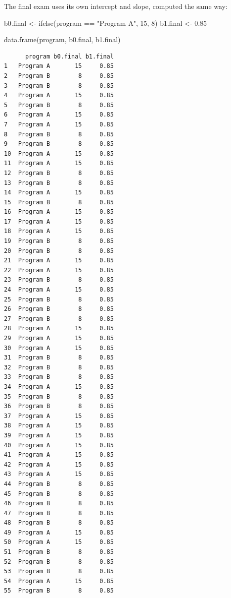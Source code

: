 \documentclass[
  letterpaper,
  DIV=11,
  numbers=noendperiod]{scrreprt}
\newenvironment{Shaded}{\begin{snugshade}}{\end{snugshade}}
\newcommand{\DecValTok}[1]{\textcolor[rgb]{0.68,0.00,0.00}{#1}}
\newcommand{\FloatTok}[1]{\textcolor[rgb]{0.68,0.00,0.00}{#1}}
\newcommand{\FunctionTok}[1]{\textcolor[rgb]{0.28,0.35,0.67}{#1}}
\newcommand{\NormalTok}[1]{\textcolor[rgb]{0.00,0.23,0.31}{#1}}
\newcommand{\OtherTok}[1]{\textcolor[rgb]{0.00,0.23,0.31}{#1}}
\newcommand{\SpecialCharTok}[1]{\textcolor[rgb]{0.37,0.37,0.37}{#1}}
\newcommand{\StringTok}[1]{\textcolor[rgb]{0.13,0.47,0.30}{#1}}
\begin{document}
The final exam uses its own intercept and slope, computed the same way:

\begin{Shaded}
\begin{Highlighting}[]
\NormalTok{b0.final }\OtherTok{\textless{}{-}} \FunctionTok{ifelse}\NormalTok{(program }\SpecialCharTok{==} \StringTok{"Program A"}\NormalTok{, }\DecValTok{15}\NormalTok{, }\DecValTok{8}\NormalTok{)}
\NormalTok{b1.final }\OtherTok{\textless{}{-}} \FloatTok{0.85}

\FunctionTok{data.frame}\NormalTok{(program, b0.final, b1.final)}
\end{Highlighting}
\end{Shaded}

\begin{verbatim}
      program b0.final b1.final
1   Program A       15     0.85
2   Program B        8     0.85
3   Program B        8     0.85
4   Program A       15     0.85
5   Program B        8     0.85
6   Program A       15     0.85
7   Program A       15     0.85
8   Program B        8     0.85
9   Program B        8     0.85
10  Program A       15     0.85
11  Program A       15     0.85
12  Program B        8     0.85
13  Program B        8     0.85
14  Program A       15     0.85
15  Program B        8     0.85
16  Program A       15     0.85
17  Program A       15     0.85
18  Program A       15     0.85
19  Program B        8     0.85
20  Program B        8     0.85
21  Program A       15     0.85
22  Program A       15     0.85
23  Program B        8     0.85
24  Program A       15     0.85
25  Program B        8     0.85
26  Program B        8     0.85
27  Program B        8     0.85
28  Program A       15     0.85
29  Program A       15     0.85
30  Program A       15     0.85
31  Program B        8     0.85
32  Program B        8     0.85
33  Program B        8     0.85
34  Program A       15     0.85
35  Program B        8     0.85
36  Program B        8     0.85
37  Program A       15     0.85
38  Program A       15     0.85
39  Program A       15     0.85
40  Program A       15     0.85
41  Program A       15     0.85
42  Program A       15     0.85
43  Program A       15     0.85
44  Program B        8     0.85
45  Program B        8     0.85
46  Program B        8     0.85
47  Program B        8     0.85
48  Program B        8     0.85
49  Program A       15     0.85
50  Program A       15     0.85
51  Program B        8     0.85
52  Program B        8     0.85
53  Program B        8     0.85
54  Program A       15     0.85
55  Program B        8     0.85

\end{verbatim}
\end{document}
